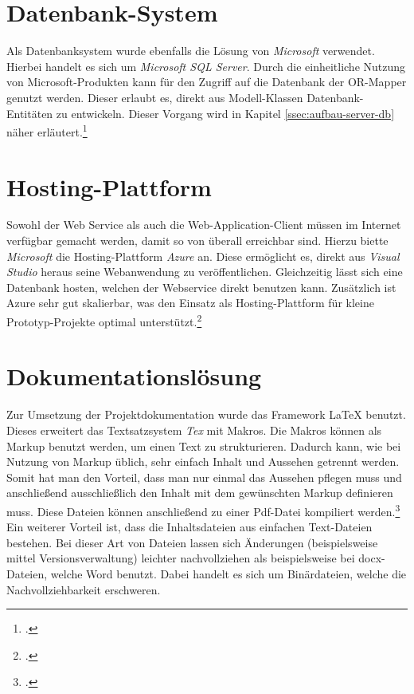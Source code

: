 \section{Datenbank-System}
\label{sec:DB-System}
Als Datenbanksystem wurde ebenfalls die Lösung von \textit{Microsoft} verwendet. Hierbei handelt es sich um \textit{Microsoft SQL Server}. Durch die einheitliche Nutzung von Microsoft-Produkten kann für den Zugriff auf die Datenbank der \ac{OR-Mapper} genutzt werden. Dieser erlaubt es, direkt aus Modell-Klassen Datenbank-Entitäten zu entwickeln. Dieser Vorgang wird in Kapitel \ref{ssec:aufbau-server-db} näher erläutert.\footcite{online:SQLServer}
\section{Hosting-Plattform}
\label{sec:Hosting-Plattform}
Sowohl der Web Service als auch die Web-Application-Client müssen im Internet verfügbar gemacht werden, damit so von überall erreichbar sind. Hierzu biette \textit{Microsoft} die Hosting-Plattform \textit{Azure} an. Diese ermöglicht es, direkt aus \textit{Visual Studio} heraus seine Webanwendung zu veröffentlichen. Gleichzeitig lässt sich eine Datenbank hosten, welchen der Webservice direkt benutzen kann. Zusätzlich ist Azure sehr gut skalierbar, was den Einsatz als Hosting-Plattform für kleine Prototyp-Projekte optimal unterstützt.\footcite{online:Azure}
\section{Dokumentationslösung}
\label{sec:dokumentationslösung}
Zur Umsetzung der Projektdokumentation wurde das Framework LaTeX benutzt. Dieses erweitert das Textsatzsystem \textit{Tex} mit Makros. Die Makros können als Markup benutzt werden, um einen Text zu strukturieren. Dadurch kann, wie bei Nutzung von Markup üblich, sehr einfach Inhalt und Aussehen getrennt werden. Somit hat man den Vorteil, dass man nur einmal das Aussehen pflegen muss und anschließend ausschließlich den Inhalt mit dem gewünschten Markup definieren muss. Diese Dateien können anschließend zu einer Pdf-Datei kompiliert werden.\footcite{online:definition-latex}\\ Ein weiterer Vorteil ist, dass die Inhaltsdateien aus einfachen Text-Dateien bestehen. Bei dieser Art von Dateien lassen sich Änderungen (beispielsweise mittel Versionsverwaltung) leichter nachvollziehen als beispielsweise bei docx-Dateien, welche Word benutzt. Dabei handelt es sich um Binärdateien, welche die Nachvollziehbarkeit erschweren.
